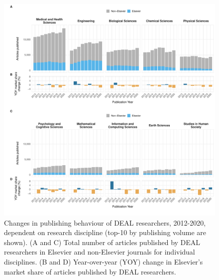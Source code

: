 \documentclass[
]{article}
\begin{document}
\begin{figure}

{\centering \includegraphics{analysis_files/figure-latex/items-publisher-year-category-1} 

}

\caption{Changes in publishing behaviour of DEAL researchers, 2012-2020, dependent on research discipline (top-10 by publishing volume are shown). (A and C) Total number of articles published by DEAL researchers in Elsevier and non-Elsevier journals for individual disciplines. (B and D) Year-over-year (YOY) change in Elsevier's market share of articles published by DEAL researchers.}\label{fig:items-publisher-year-category}
\end{figure}
\end{document}
